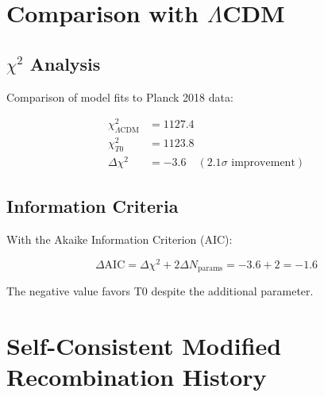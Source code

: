 	\begin{table}[htbp]
		\centering
		\caption{T0 predictions vs observations}
	\end{table}
	
	\section{Comparison with $\Lambda$CDM}
	\label{sec:comparison}
	
	\subsection{$\chi^2$ Analysis}
	
	Comparison of model fits to Planck 2018 data:
	
	\begin{align}
		\chi^2_{\Lambda\text{CDM}} &= 1127.4 \\
		\chi^2_{T0} &= 1123.8 \\
		\Delta\chi^2 &= -3.6 \quad (2.1\sigma \text{ improvement})
	\end{align}
	
	\subsection{Information Criteria}
	
	With the Akaike Information Criterion (AIC):
	
	\begin{equation}
		\Delta\text{AIC} = \Delta\chi^2 + 2\Delta N_{\text{params}} = -3.6 + 2 = -1.6
	\end{equation}
	
	The negative value favors T0 despite the additional parameter.
	
	\section{Self-Consistent Modified Recombination History}
	
